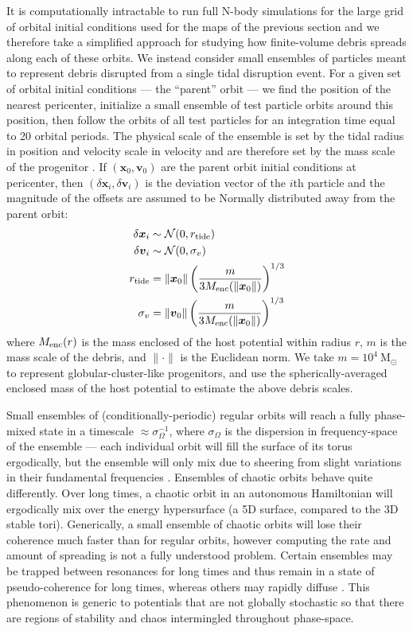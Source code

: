 \documentclass[letterpaper,12pt,preprint]{aastex}
\newcommand{\msun}{\ensuremath{\mathrm{M}_\odot}}
\newcommand{\bs}[1]{\boldsymbol{#1}}
\begin{document}
It is computationally intractable to run full N-body simulations for the large grid of orbital initial conditions used for the maps of the previous section and we therefore take a simplified approach for studying how finite-volume debris spreads along each of these orbits. We instead consider small ensembles of particles meant to represent debris disrupted from a single tidal disruption event. For a given set of orbital initial conditions --- the ``parent'' orbit --- we find the position of the nearest pericenter, initialize a small ensemble of test particle orbits around this position, then follow the orbits of all test particles for an integration time equal to 20 orbital periods. The physical scale of the ensemble is set by the tidal radius in position and velocity scale in velocity and are therefore set by the mass scale of the progenitor \citep[e.g.,][]{johnston98, apw14}. If $(\bs{x}_0,\bs{v}_0)$ are the parent orbit initial conditions at pericenter, then $(\delta\bs{x}_i,\delta\bs{v}_i)$ is the deviation vector of the $i$th particle and the magnitude of the offsets are assumed to be Normally distributed away from the parent orbit:
\begin{align}
	\delta\bs{x}_i &\sim \mathcal{N}(0, r_{\rm tide})\\
	\delta\bs{v}_i &\sim \mathcal{N}(0, \sigma_v)\\
	r_{\rm tide} &= \|\bs{x}_0\| \left(\frac{m}{3M_{\rm enc}(\|\bs{x}_0\|)}\right)^{1/3} \\
	\sigma_v &= \|\bs{v}_0\|\left(\frac{m}{3M_{\rm enc}(\|\bs{x}_0\|)}\right)^{1/3} 
\end{align}
where $M_{\rm enc}(r)$ is the mass enclosed of the host potential within radius $r$, $m$ is the mass scale of the debris, and $\|\cdot \|$ is the Euclidean norm. We take $m=10^4~\msun$ to represent globular-cluster-like progenitors, and use the spherically-averaged enclosed mass of the host potential to estimate the above debris scales.

Small ensembles of (conditionally-periodic) regular orbits will reach a fully phase-mixed state in a timescale  $\approx\sigma_\Omega^{-1}$, where $\sigma_\Omega$ is the dispersion in frequency-space of the ensemble --- each individual orbit will fill the surface of its torus ergodically, but the ensemble will only mix due to sheering from slight variations in their fundamental frequencies \citep{merritt96, helmi99}. Ensembles of chaotic orbits behave quite differently. Over long times, a chaotic orbit in an autonomous Hamiltonian will ergodically mix over the energy hypersurface (a 5D surface, compared to the 3D stable tori). Generically, a small ensemble of chaotic orbits will lose their coherence much faster than for regular orbits, however computing the rate and amount of spreading is not a fully understood problem. Certain ensembles may be trapped between resonances for long times and thus remain in a state of pseudo-coherence for long times, whereas others may rapidly diffuse \citep[see, e.g.,][]{merritt96}. This phenomenon is generic to potentials that are not globally stochastic so that there are regions of stability and chaos intermingled throughout phase-space. 
\end{document}

